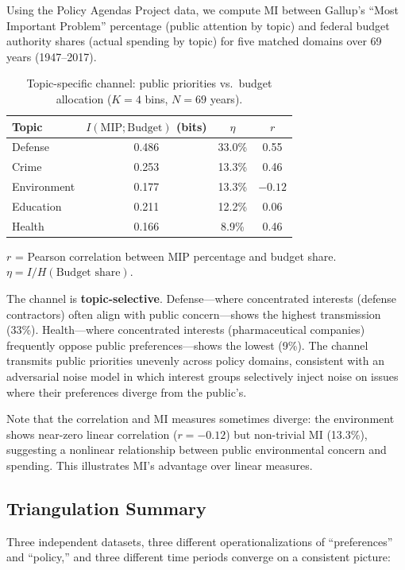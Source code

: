 \documentclass[twocolumn,10pt]{article}
\begin{document}
Using the Policy Agendas Project data, we compute MI between Gallup's ``Most Important Problem'' percentage (public attention by topic) and federal budget authority shares (actual spending by topic) for five matched domains over 69 years (1947--2017).

\begin{table}[t]
\centering
\caption{Topic-specific channel: public priorities vs.\ budget allocation ($K=4$ bins, $N=69$ years).}
\label{tab:budget}
\begin{tabular}{@{}lccc@{}}
\toprule
Topic & $I(\text{MIP}; \text{Budget})$ (bits) & $\eta$ & $r$ \\
\midrule
Defense & 0.486 & 33.0\% & 0.55 \\
Crime & 0.253 & 13.3\% & 0.46 \\
Environment & 0.177 & 13.3\% & $-0.12$ \\
Education & 0.211 & 12.2\% & 0.06 \\
Health & 0.166 & 8.9\% & 0.46 \\
\bottomrule
\end{tabular}
\smallskip

\footnotesize{$r$ = Pearson correlation between MIP percentage and budget share.  $\eta = I/H(\text{Budget share})$.}
\end{table}

The channel is \textbf{topic-selective}.  Defense---where concentrated interests (defense contractors) often align with public concern---shows the highest transmission (33\%).  Health---where concentrated interests (pharmaceutical companies) frequently oppose public preferences---shows the lowest (9\%).  The channel transmits public priorities unevenly across policy domains, consistent with an adversarial noise model in which interest groups selectively inject noise on issues where their preferences diverge from the public's.

Note that the correlation and MI measures sometimes diverge: the environment shows near-zero linear correlation ($r = -0.12$) but non-trivial MI (13.3\%), suggesting a nonlinear relationship between public environmental concern and spending.  This illustrates MI's advantage over linear measures.

\subsection{Triangulation Summary}

Three independent datasets, three different operationalizations of ``preferences'' and ``policy,'' and three different time periods converge on a consistent picture:
\end{document}

